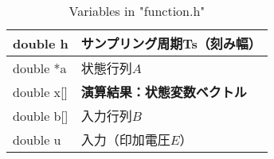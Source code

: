 \documentclass[a4paper,10pt,twocolumn,fleqn]{jarticle}
\begin{document}
    \begin{table}[htp]
      \centering
      \caption{Variables in "function.h"}
      \label{function.h}
      \begin{tabular}{|l|l|}
      \hline
      double h       & サンプリング周期Ts（刻み幅） \\ \hline
      double *a      & 状態行列$A$ \\ \hline
      double x{[}{]} & \bf 演算結果：状態変数ベクトル  \\ \hline
      double b{[}{]} & 入力行列$B$ \\ \hline
      double u       & 入力（印加電圧$E$）  \\ \hline
      \end{tabular}
    \end{table}
\end{document}
